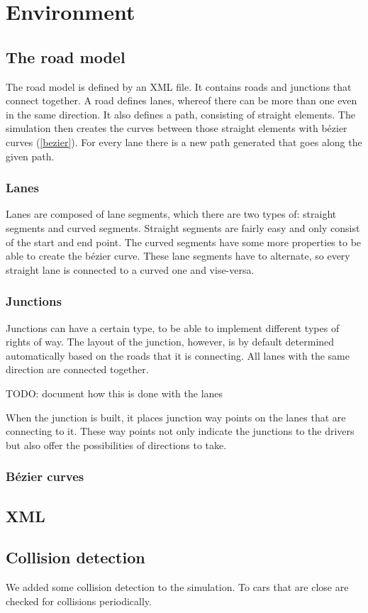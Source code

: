 
\section{Environment}
\label{sec:environment}

\subsection{The road model}
\label{sec:roadModel}

The road model is defined by an XML file. It contains roads and
junctions that connect together. A road defines lanes, whereof
there can be more than one even in the same direction. It also defines
a path, consisting of straight elements. The simulation then creates the 
curves between those straight elements with bézier curves (\ref{bezier}).
For every lane there is a new path generated that goes along the given path.


\subsubsection{Lanes}
\label{sec:lanes}

Lanes are composed of lane segments, which there are two types of:
straight segments and curved segments. Straight segments are fairly
easy and only consist of the start and end point. The curved segments
have some more properties to be able to create the bézier curve. 
These lane segments have to alternate, so every straight lane is connected
to a curved one and vise-versa. \\


\subsubsection{Junctions}
\label{sec:junctions}

Junctions can have a certain type, to be able to implement different types
of rights of way. The layout of the junction, however, is by default 
determined automatically based on the roads that it is connecting. All 
lanes with the same direction are connected together. 

TODO: document how this is done with the lanes

\noindent When the junction is built, it places junction way points on the
lanes that are connecting to it. These way points not only indicate the
junctions to the drivers but also offer the possibilities of directions
to take.

\subsubsection{Bézier curves}
\label{sec:bezier}


\subsection{XML}
\label{sec:XML}

\subsection{Collision detection}

We added some collision detection to the simulation. To cars
that are close are checked for collisions periodically.

